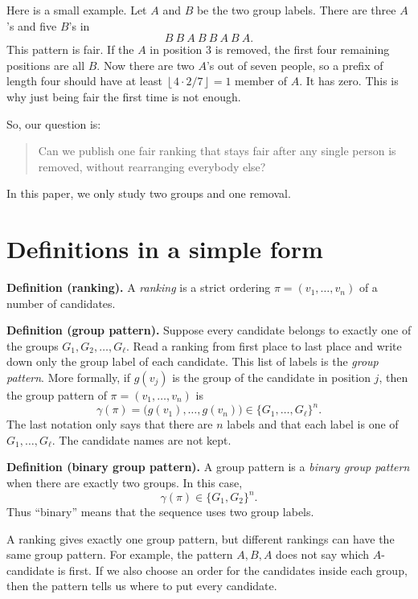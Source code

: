 \documentclass[11pt]{article}
\newcommand{\floor}[1]{\left\lfloor #1\right\rfloor}
\begin{document}
Here is a small example.  Let $A$ and $B$ be the two group labels.  There are
three $A$'s and five $B$'s in
\[
  B\ B\ A\ B\ B\ A\ B\ A.
\]
This pattern is fair.  If the $A$ in position 3 is removed, the first four
remaining positions are all $B$.  Now there are two $A$'s out of seven people,
so a prefix of length four should have at least
$\floor{4\cdot2/7}=1$ member of $A$.  It has zero.  This is why just being fair
the first time is not enough.

So, our question is:

\begin{quote}
Can we publish one fair ranking that stays fair after any single person is
removed, without rearranging everybody else?
\end{quote}

In this paper, we only study two groups and one removal.

\section{Definitions in a simple form}

\medskip
\noindent\textbf{Definition (ranking).}
A \emph{ranking} is a strict ordering $\pi=(v_1,\ldots,v_n)$ of a number of candidates.
\medskip

\noindent\textbf{Definition (group pattern).}
Suppose every candidate belongs to exactly one of the groups
$G_1,G_2,\ldots,G_\ell$.  Read a ranking from first place to last place and
write down only the group label of each candidate.  This list of labels is the
\emph{group pattern}.  More formally, if $g(v_j)$ is the group of the
candidate in position $j$, then the group pattern of
$\pi=(v_1,\ldots,v_n)$ is
\[
 \gamma(\pi)=\bigl(g(v_1),\ldots,g(v_n)\bigr)
 \in\{G_1,\ldots,G_\ell\}^n.
\]
The last notation only says that there are $n$ labels and that each label is
one of $G_1,\ldots,G_\ell$.  The candidate names are not kept.
\medskip

\noindent\textbf{Definition (binary group pattern).}
A group pattern is a \emph{binary group pattern} when there are exactly two
groups.  In this case,
\[
 \gamma(\pi)\in\{G_1,G_2\}^n.
\]
Thus ``binary'' means that the sequence uses two group labels.

A ranking gives exactly one group pattern, but different rankings can have
the same group pattern.  For example, the pattern $A,B,A$ does not say which
$A$-candidate is first.  If we also choose an order for the candidates inside
each group, then the pattern tells us where to put every candidate.
\medskip
\end{document}
